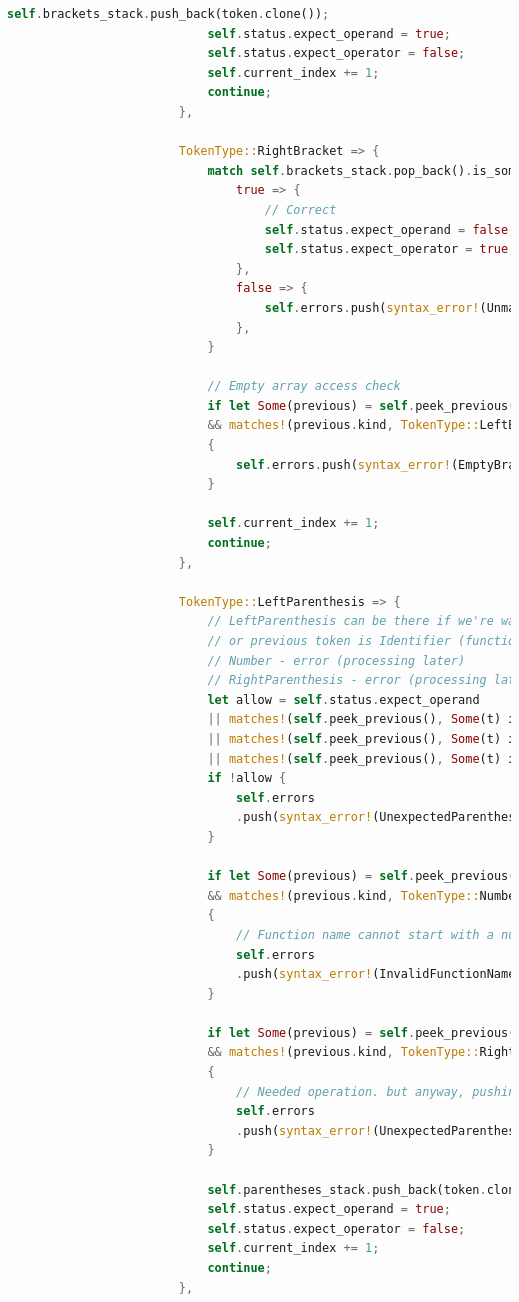 \documentclass[14pt, a4paper]{extreport}
\begin{document}
\begin{lstlisting}[language=Rust]
							self.brackets_stack.push_back(token.clone());
							self.status.expect_operand = true;
							self.status.expect_operator = false;
							self.current_index += 1;
							continue;
						},
						
						TokenType::RightBracket => {
							match self.brackets_stack.pop_back().is_some() {
								true => {
									// Correct
									self.status.expect_operand = false;
									self.status.expect_operator = true;
								},
								false => {
									self.errors.push(syntax_error!(UnmatchedBrackets, token))
								},
							}
							
							// Empty array access check
							if let Some(previous) = self.peek_previous()
							&& matches!(previous.kind, TokenType::LeftBracket)
							{
								self.errors.push(syntax_error!(EmptyBrackets, token));
							}
							
							self.current_index += 1;
							continue;
						},
						
						TokenType::LeftParenthesis => {
							// LeftParenthesis can be there if we're waiting for operand (grouping)
							// or previous token is Identifier (function call)
							// Number - error (processing later)
							// RightParenthesis - error (processing later)
							let allow = self.status.expect_operand
							|| matches!(self.peek_previous(), Some(t) if matches!(t.kind, TokenType::Identifier))
							|| matches!(self.peek_previous(), Some(t) if matches!(t.kind, TokenType::RightParenthesis))
							|| matches!(self.peek_previous(), Some(t) if matches!(t.kind, TokenType::Number));
							if !allow {
								self.errors
								.push(syntax_error!(UnexpectedParenthesis, token));
							}
							
							if let Some(previous) = self.peek_previous()
							&& matches!(previous.kind, TokenType::Number)
							{
								// Function name cannot start with a number
								self.errors
								.push(syntax_error!(InvalidFunctionName, previous));
							}
							
							if let Some(previous) = self.peek_previous()
							&& matches!(previous.kind, TokenType::RightParenthesis)
							{
								// Needed operation. but anyway, pushing to the stack
								self.errors
								.push(syntax_error!(UnexpectedParenthesis, token));
							}
							
							self.parentheses_stack.push_back(token.clone());
							self.status.expect_operand = true;
							self.status.expect_operator = false;
							self.current_index += 1;
							continue;
						},
						

\end{lstlisting}
\end{document}
